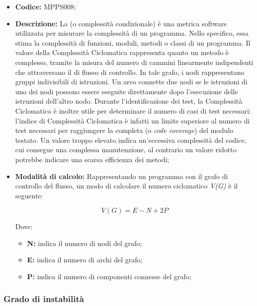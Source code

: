\documentclass[../NormediProgetto.tex]{subfiles}
\begin{document}
\begin{itemize}
	\item \textbf{Codice:} MPPS008;
	
	\item \textbf{Descrizione:} La  (o complessità condizionale) è una metrica software utilizzata per misurare la complessità di un programma. Nello specifico, essa stima la complessità di funzioni, moduli, metodi o classi di un programma. Il valore della Complessità Ciclomatica rappresenta quanto un metodo è complesso, tramite la misura del numero di cammini linearmente indipendenti che attraversano il  di flusso di controllo. In tale grafo, i nodi rappresentano gruppi indivisibili di istruzioni. Un arco connette due nodi se le istruzioni di uno dei nodi possono essere eseguite direttamente dopo l'esecuzione delle istruzioni dell'altro nodo. Durante l’identificazione dei test, la Complessità Ciclomatica è inoltre utile per determinare il numero di casi di test necessari: l’indice di Complessità Ciclomatica è infatti un limite superiore al numero di test necessari per raggiungere la completa  (o \textit{code coverage}) del modulo testato. Un valore troppo elevato indica un'eccessiva complessità del codice, cui consegue una complessa manutenzione, al contrario un valore ridotto potrebbe indicare una scarsa efficienza dei metodi;
	
	\item \textbf{Modalità di calcolo:} Rappresentando un programma con il grafo di controllo del flusso, un modo di calcolare il numero ciclomatico \textit{V(G)} è il seguente:
	
	\[ V(G) = E - N + 2P \]
	
	Dove:
	
	\begin{itemize}
		\item \textbf{N:} indica il numero di nodi del grafo;
		\item \textbf{E:} indica il numero di archi del grafo;
		\item \textbf{P:} indica il numero di componenti connesse del grafo;
	\end{itemize}
\end{itemize}

\subsubsection{Grado di instabilità}
\end{document}
